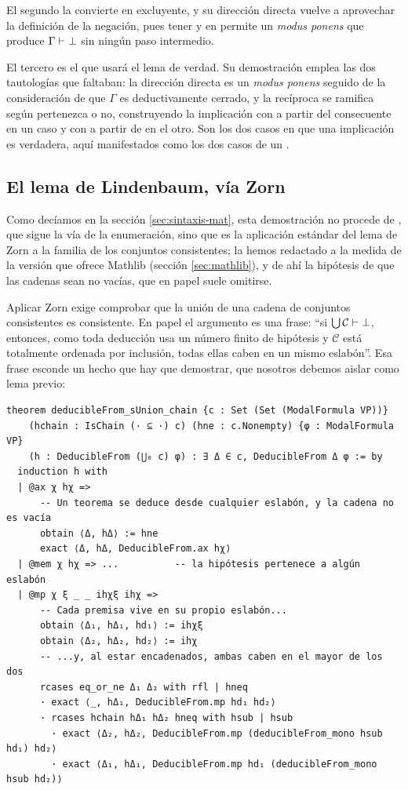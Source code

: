 El segundo la convierte en excluyente, y su dirección directa vuelve a aprovechar la definición de la negación, pues tener  y  en  permite un \emph{modus ponens} que produce $\Gamma \vdash \bot$ sin ningún paso intermedio.

El tercero es el que usará el lema de verdad. Su demostración emplea las dos tautologías que faltaban: la dirección directa es un \emph{modus ponens} seguido de la consideración de que $\Gamma$ es deductivamente cerrado, y la recíproca se ramifica según  pertenezca o no, construyendo la implicación con  a partir del consecuente en un caso y con  a partir de  en el otro. Son los dos casos en que una implicación es verdadera, aquí manifestados como los dos casos de un .

\subsection{El lema de Lindenbaum, vía Zorn}\label{subsec:comp-lind}

Como decíamos en la sección \ref{sec:sintaxis-mat}, esta demostración no procede de \cite{blackburn}, que sigue la vía de la enumeración, sino que es la aplicación estándar del lema de Zorn a la familia de los conjuntos consistentes; la hemos redactado a la medida de la versión que ofrece Mathlib (sección \ref{sec:mathlib}), y de ahí la hipótesis de que las cadenas sean no vacías, que en papel suele omitirse.

Aplicar Zorn exige comprobar que la unión de una cadena de conjuntos consistentes es consistente. En papel el argumento es una frase: ``si $\bigcup \mathcal{C} \vdash \bot$, entonces, como toda deducción usa un número finito de hipótesis y $\mathcal{C}$ está totalmente ordenada por inclusión, todas ellas caben en un mismo eslabón''. Esa frase esconde un hecho que hay que demostrar, que nosotros debemos aislar como lema previo:

\begin{lstlisting}
theorem deducibleFrom_sUnion_chain {c : Set (Set (ModalFormula VP))}
    (hchain : IsChain (· ⊆ ·) c) (hne : c.Nonempty) {φ : ModalFormula VP}
    (h : DeducibleFrom (⋃₀ c) φ) : ∃ Δ ∈ c, DeducibleFrom Δ φ := by
  induction h with
  | @ax χ hχ =>
      -- Un teorema se deduce desde cualquier eslabón, y la cadena no es vacía
      obtain ⟨Δ, hΔ⟩ := hne
      exact ⟨Δ, hΔ, DeducibleFrom.ax hχ⟩
  | @mem χ hχ => ...          -- la hipótesis pertenece a algún eslabón
  | @mp χ ξ _ _ ihχξ ihχ =>
      -- Cada premisa vive en su propio eslabón...
      obtain ⟨Δ₁, hΔ₁, hd₁⟩ := ihχξ
      obtain ⟨Δ₂, hΔ₂, hd₂⟩ := ihχ
      -- ...y, al estar encadenados, ambas caben en el mayor de los dos
      rcases eq_or_ne Δ₁ Δ₂ with rfl | hneq
      · exact ⟨_, hΔ₁, DeducibleFrom.mp hd₁ hd₂⟩
      · rcases hchain hΔ₁ hΔ₂ hneq with hsub | hsub
        · exact ⟨Δ₂, hΔ₂, DeducibleFrom.mp (deducibleFrom_mono hsub hd₁) hd₂⟩
        · exact ⟨Δ₁, hΔ₁, DeducibleFrom.mp hd₁ (deducibleFrom_mono hsub hd₂)⟩
\end{lstlisting}

